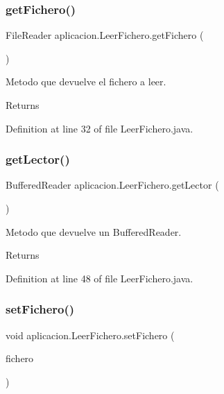 \subsubsection{\texorpdfstring{get\+Fichero()}{getFichero()}}
{\footnotesize\ttfamily File\+Reader aplicacion.\+Leer\+Fichero.\+get\+Fichero (\begin{DoxyParamCaption}{ }\end{DoxyParamCaption})}

Metodo que devuelve el fichero a leer. \begin{DoxyReturn}{Returns}

\end{DoxyReturn}


Definition at line 32 of file Leer\+Fichero.\+java.

\hypertarget{classaplicacion_1_1_leer_fichero_ae9b6c34feb9e518c222eb23937a81716}{}\label{classaplicacion_1_1_leer_fichero_ae9b6c34feb9e518c222eb23937a81716} 
\subsubsection{\texorpdfstring{get\+Lector()}{getLector()}}
{\footnotesize\ttfamily Buffered\+Reader aplicacion.\+Leer\+Fichero.\+get\+Lector (\begin{DoxyParamCaption}{ }\end{DoxyParamCaption})}

Metodo que devuelve un Buffered\+Reader. \begin{DoxyReturn}{Returns}

\end{DoxyReturn}


Definition at line 48 of file Leer\+Fichero.\+java.

\hypertarget{classaplicacion_1_1_leer_fichero_a8472b4b43bd6e2d3bc65a45e1f935b18}{}\label{classaplicacion_1_1_leer_fichero_a8472b4b43bd6e2d3bc65a45e1f935b18} 
\subsubsection{\texorpdfstring{set\+Fichero()}{setFichero()}}
{\footnotesize\ttfamily void aplicacion.\+Leer\+Fichero.\+set\+Fichero (\begin{DoxyParamCaption}\item[{File\+Reader}]{fichero }\end{DoxyParamCaption})}


